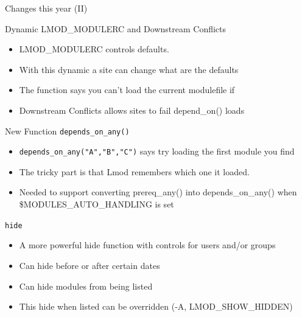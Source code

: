 \documentclass{beamer}
\begin{document}
\begin{frame}{Changes this year (II)}
\end{frame}

\begin{frame}{Dynamic LMOD\_MODULERC and Downstream Conflicts}
  \begin{itemize}
    \item LMOD\_MODULERC controls defaults.
    \item With this dynamic a site can change what are the defaults
    \item The  function says you can't load the
      current modulefile if 
    \item Downstream Conflicts allows sites to fail depend_on() loads 
  \end{itemize}
\end{frame}

\begin{frame}{New Function \texttt{depends\_on\_any()}}
  \begin{itemize}
    \item \texttt{depends\_on\_any("A","B","C")} says try loading the
      first module you find
    \item The tricky part is that Lmod remembers which one it loaded.
    \item Needed to support converting prereq\_any() into
      depends\_on\_any() when \$MODULES_AUTO_HANDLING is set
  \end{itemize}
\end{frame}

\begin{frame}{\texttt{hide{}}}
  \begin{itemize}
    \item A more powerful hide function with controls for users and/or
      groups
    \item Can hide before or after certain dates
    \item Can hide modules from being listed
    \item This hide when listed can be overridden (-A, LMOD\_SHOW\_HIDDEN)
  \end{itemize}
\end{frame}
\end{document}
